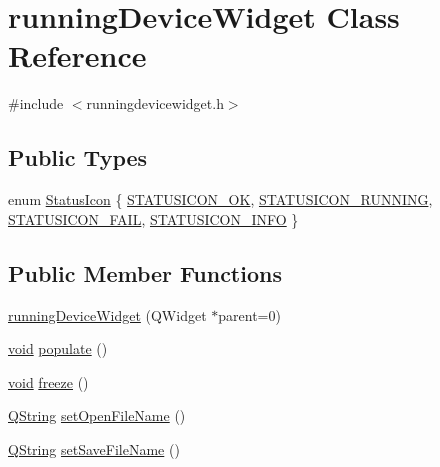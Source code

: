 \hypertarget{classrunning_device_widget}{\section{running\-Device\-Widget \-Class \-Reference}
\label{classrunning_device_widget}
}


{\ttfamily \#include $<$runningdevicewidget.\-h$>$}

\subsection*{\-Public \-Types}
\begin{DoxyCompactItemize}
\item 
enum \hyperlink{group___y_modem_uploader_ga2544534d93816d92882b9351db3e3832}{\-Status\-Icon} \{ \hyperlink{group___y_modem_uploader_gga2544534d93816d92882b9351db3e3832a9ee79f7fd0f08c1c300815f7dda5f034}{\-S\-T\-A\-T\-U\-S\-I\-C\-O\-N\-\_\-\-O\-K}, 
\hyperlink{group___y_modem_uploader_gga2544534d93816d92882b9351db3e3832a2dfa2228c471d23502656be472cfea8a}{\-S\-T\-A\-T\-U\-S\-I\-C\-O\-N\-\_\-\-R\-U\-N\-N\-I\-N\-G}, 
\hyperlink{group___y_modem_uploader_gga2544534d93816d92882b9351db3e3832acbb5494d2fd96bb7d0b706e0125e0089}{\-S\-T\-A\-T\-U\-S\-I\-C\-O\-N\-\_\-\-F\-A\-I\-L}, 
\hyperlink{group___y_modem_uploader_gga2544534d93816d92882b9351db3e3832acfa9666424709e360d9f9e7d9af00ab4}{\-S\-T\-A\-T\-U\-S\-I\-C\-O\-N\-\_\-\-I\-N\-F\-O}
 \}
\end{DoxyCompactItemize}
\subsection*{\-Public \-Member \-Functions}
\begin{DoxyCompactItemize}
\item 
\hyperlink{group___y_modem_uploader_ga768545e1c1edb88b0a2b2d87b8c02202}{running\-Device\-Widget} (\-Q\-Widget $\ast$parent=0)
\item 
\hyperlink{group___u_a_v_objects_plugin_ga444cf2ff3f0ecbe028adce838d373f5c}{void} \hyperlink{group___uploader_ga361969437ae7c23ebaa3d646e742dbc5}{populate} ()
\item 
\hyperlink{group___u_a_v_objects_plugin_ga444cf2ff3f0ecbe028adce838d373f5c}{void} \hyperlink{group___y_modem_uploader_gabdf38e4bfbb45785ce938043aed76fc9}{freeze} ()
\item 
\hyperlink{group___u_a_v_objects_plugin_gab9d252f49c333c94a72f97ce3105a32d}{\-Q\-String} \hyperlink{group___y_modem_uploader_gafa1350e74a2173b31997cb6662dc4fee}{set\-Open\-File\-Name} ()
\item 
\hyperlink{group___u_a_v_objects_plugin_gab9d252f49c333c94a72f97ce3105a32d}{\-Q\-String} \hyperlink{group___y_modem_uploader_ga47452d9426396c22a0c0734f2c7a9f51}{set\-Save\-File\-Name} ()
\end{DoxyCompactItemize}
